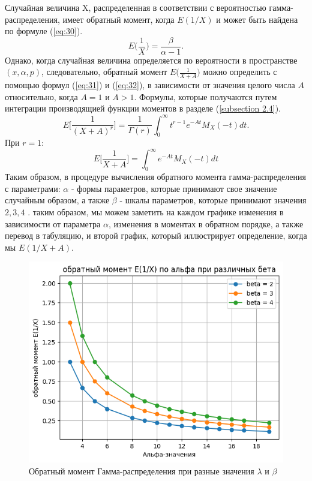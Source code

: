\documentclass[13pt]{article}
\begin{document}
Случайная величина X, распределенная в соответствии с вероятностью гамма-распределения, имеет обратный момент, когда $E(1/X)$ и может быть найдена по формуле (\ref{eq:30}).
\begin{equation*}
    E\bigg(\frac{1}{X}\bigg) =\frac{\beta}{\alpha - 1}.
\end{equation*}
Однако, когда случайная величина определяется по вероятности в пространстве $(x, \alpha, p)$, следовательно, обратный момент $E\big( \frac{1}{X+A}\big)$ можно определить с помощью формул (\ref{eq:31}) и (\ref{eq:32}), в зависимости от значения целого числа $A$ относительно, когда $A = 1$ и $ A > 1$. Формулы, которые получаются путем интеграции производящией функции моментов в разделе (\ref{subsection 2.4}).
\begin{equation*}
    E\bigg[\frac{1}{(X+A)^{r}}\bigg] = \frac{1}{\Gamma(r)} \int_{0}^{\infty}t^{r-1}e^{-At}M_{X}(-t)dt.
\end{equation*}
При $r=1$:
\begin{equation*}
    E\bigg[\frac{1}{X+A}\bigg] =  \int_{0}^{\infty}e^{-At}M_{X}(-t)dt 
\end{equation*}
Таким образом, в процедуре вычисления обратного момента гамма-распределения с параметрами: $\alpha$ - формы параметров, которые принимают свое значение случайным образом, а также $\beta$ - шкалы параметров, которые принимают значения $2,3,4$ . таким образом, мы можем заметить на каждом графике изменения в зависимости от параметра $\alpha$, изменения в моментах в обратном порядке, а также перевод в табуляцию, и второй график, который иллюстрирует определение, когда мы $E(1 / X+ A)$.

\vspace{10 mm}
\begin{figure}[htp]
    \centering
    \includegraphics[width=14 cm]{images/gamma1.png}
    \caption{ Обратный момент Гамма-распределения при разные значения $\lambda$ и $\beta$ }
    \label{gamma_fig}
\end{figure}
\vspace{10 mm}

\end{document}
